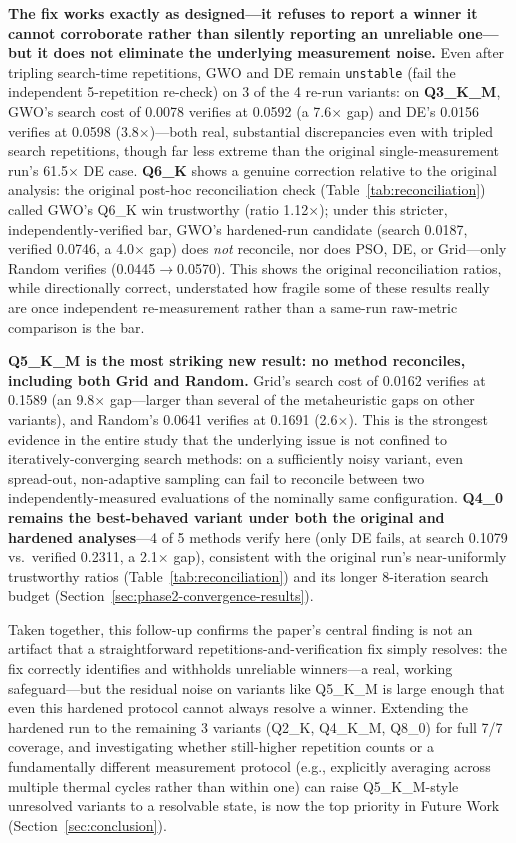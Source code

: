 \documentclass[journal]{IEEEtran}
\begin{document}
\textbf{The fix works exactly as designed---it refuses to report a winner it cannot corroborate rather than silently reporting an unreliable one---but it does not eliminate the underlying measurement noise.} Even after tripling search-time repetitions, GWO and DE remain \texttt{unstable} (fail the independent 5-repetition re-check) on 3 of the 4 re-run variants: on \textbf{Q3\_K\_M}, GWO's search cost of 0.0078 verifies at 0.0592 (a 7.6$\times$ gap) and DE's 0.0156 verifies at 0.0598 (3.8$\times$)---both real, substantial discrepancies even with tripled search repetitions, though far less extreme than the original single-measurement run's 61.5$\times$ DE case. \textbf{Q6\_K} shows a genuine correction relative to the original analysis: the original post-hoc reconciliation check (Table~\ref{tab:reconciliation}) called GWO's Q6\_K win trustworthy (ratio 1.12$\times$); under this stricter, independently-verified bar, GWO's hardened-run candidate (search 0.0187, verified 0.0746, a 4.0$\times$ gap) does \emph{not} reconcile, nor does PSO, DE, or Grid---only Random verifies (0.0445$\to$0.0570). This shows the original reconciliation ratios, while directionally correct, understated how fragile some of these results really are once independent re-measurement rather than a same-run raw-metric comparison is the bar.

\textbf{Q5\_K\_M is the most striking new result: no method reconciles, including both Grid and Random.} Grid's search cost of 0.0162 verifies at 0.1589 (an 9.8$\times$ gap---larger than several of the metaheuristic gaps on other variants), and Random's 0.0641 verifies at 0.1691 (2.6$\times$). This is the strongest evidence in the entire study that the underlying issue is not confined to iteratively-converging search methods: on a sufficiently noisy variant, even spread-out, non-adaptive sampling can fail to reconcile between two independently-measured evaluations of the nominally same configuration. \textbf{Q4\_0 remains the best-behaved variant under both the original and hardened analyses}---4 of 5 methods verify here (only DE fails, at search 0.1079 vs.\ verified 0.2311, a 2.1$\times$ gap), consistent with the original run's near-uniformly trustworthy ratios (Table~\ref{tab:reconciliation}) and its longer 8-iteration search budget (Section~\ref{sec:phase2-convergence-results}).

Taken together, this follow-up confirms the paper's central finding is not an artifact that a straightforward repetitions-and-verification fix simply resolves: the fix correctly identifies and withholds unreliable winners---a real, working safeguard---but the residual noise on variants like Q5\_K\_M is large enough that even this hardened protocol cannot always resolve a winner. Extending the hardened run to the remaining 3 variants (Q2\_K, Q4\_K\_M, Q8\_0) for full 7/7 coverage, and investigating whether still-higher repetition counts or a fundamentally different measurement protocol (e.g., explicitly averaging across multiple thermal cycles rather than within one) can raise Q5\_K\_M-style unresolved variants to a resolvable state, is now the top priority in Future Work (Section~\ref{sec:conclusion}).
\end{document}

